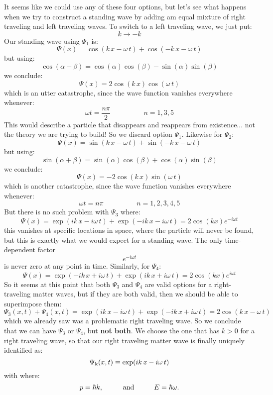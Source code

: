 \documentclass[12pt]{book}
\begin{document}
It seems like we could use any of these four options, but let's see what happens when we try to construct a standing wave by adding am equal mixture of right traveling and left traveling waves.  To switch to a left traveling wave, we just put:
$$k \to -k$$
Our standing wave using $\Psi_1$ is:
$$\Psi(x) = \cos(k\,x-\omega \, t) + \cos(-k\,x-\omega \, t)$$
but using:
$$\cos(\alpha + \beta) = \cos(\alpha)\cos(\beta) - \sin(\alpha)\sin(\beta)$$
we conclude:
$$\Psi(x) = 2 \cos(k\,x) \cos(\omega \, t)$$
which is an utter catastrophe, since the wave function vanishes everywhere whenever:
$$\omega t = \frac{n \pi}{2} \hspace{2cm} n=1,3,5$$
This would describe a particle that disappears and reappears from existence... not the theory we are trying to build!  So we discard option $\Psi_1$. Likewise for $\Psi_2$:
$$\Psi(x) = \sin(k\,x-\omega \, t) + \sin(-k\,x-\omega \, t)$$
but using:
$$\sin(\alpha + \beta) = \sin(\alpha)\cos(\beta) + \cos(\alpha)\sin(\beta)$$
we conclude:
$$\Psi(x) = -2\cos(k\,x) \sin(\omega \, t)$$
which is another catastrophe, since the wave function vanishes everywhere whenever:
$$\omega t = n \pi \hspace{2cm} n=1,2,3,4,5$$
But there is no such problem with $\Psi_3$ where:
$$\Psi(x) = \exp(ik\,x-i\omega \, t) + \exp(-ik\,x-i\omega \, t) = 2 \cos(kx) e^{\displaystyle -i\omega t}$$
this vanishes at specific locations in space, where the particle will never be found, but this is exactly what we would expect for a standing wave.  The only time-dependent factor 
$$e^{\displaystyle -i \omega t}$$
is never zero at any point in time.  Similarly, for $\Psi_4$:
$$\Psi(x) = \exp(-ik\,x+i\omega \, t) + \exp(ik\,x+i\omega \, t) = 2 \cos(kx) e^{\displaystyle i\omega t}$$
So it seems at this point that both $\Psi_3$ and $\Psi_4$ are valid options for a right-traveling matter waves, but if they are both valid, then we should be able to superimpose them:
$$\Psi_3(x,t) + \Psi_4(x,t) = \exp(ik\,x-i\omega \, t) + \exp(-ik\,x+i\omega \, t)
= 2 \cos(k\,x-\omega\,t)$$
which we already saw was a problematic right traveling wave.  So we conclude that we can have $\Psi_3$ or $\Psi_4$, but {\bf not both}.  We choose the one that has $k>0$ for a right traveling wave, so that our right traveling matter wave is finally uniquely identified as:
\begin{equation}
\Psi_{\rm k}(x,t) \equiv \exp(ik\,x-i \omega \, t)
\end{equation}
with where:
$$p=\hbar k, \hspace{1cm} {\rm and} \hspace{1cm} E = \hbar \omega.$$
\end{document}

